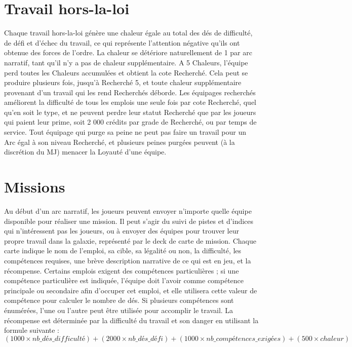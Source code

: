 \documentclass{article}
\begin{document}
\section*{Travail hors-la-loi}
Chaque travail hors-la-loi génère une chaleur égale au total des dés de difficulté, de défi et d’échec du travail, ce qui représente l'attention négative qu'ils ont obtenue des forces de l’ordre. La chaleur se détériore naturellement de 1 par arc narratif, tant qu'il n'y a pas de chaleur supplémentaire. A 5 Chaleurs, l'équipe perd toutes les Chaleurs accumulées et obtient la cote Recherché. Cela peut se produire plusieurs fois, jusqu'à Recherché 5, et toute chaleur supplémentaire provenant d'un travail qui les rend Recherchés déborde. Les équipages recherchés améliorent la difficulté de tous les emplois une seule fois par cote Recherché, quel qu'en soit le type, et ne peuvent perdre leur statut Recherché que par les joueurs qui paient leur prime, soit 2 000 crédits par grade de Recherché, ou par temps de service. Tout équipage qui purge sa peine ne peut pas faire un travail pour un Arc égal à son niveau Recherché, et plusieurs peines purgées peuvent (à la discrétion du MJ) menacer la Loyauté d'une équipe.

\section*{Missions}
Au début d'un arc narratif, les joueurs peuvent envoyer n'importe quelle équipe disponible pour réaliser une mission. Il peut s'agir du suivi de pistes et d’indices qui n’intéressent pas les joueurs, ou à envoyer des équipes pour trouver leur propre travail dans la galaxie, représenté par le deck de carte de mission.
Chaque carte indique le nom de l'emploi, sa cible, sa légalité ou non, la difficulté, les compétences requises, une brève description narrative de ce qui est en jeu, et la récompense. Certains emplois exigent des compétences particulières ; si une compétence particulière est indiquée, l'équipe doit l'avoir comme compétence principale ou secondaire afin d'occuper cet emploi, et elle utilisera cette valeur de compétence pour calculer le nombre de dés. Si plusieurs compétences sont énumérées, l'une ou l'autre peut être utilisée pour accomplir le travail. La récompense est déterminée par la difficulté du travail et son danger en utilisant la formule suivante :
\[
(1 000 \times \mathit{nb\_dés\_difficulté}) + (2 000 \times \mathit{nb\_dés\_défi}) + (1 000 \times \mathit{nb\_compétences\_exigées}) + (500 \times \mathit{chaleur})
\]
\end{document}
